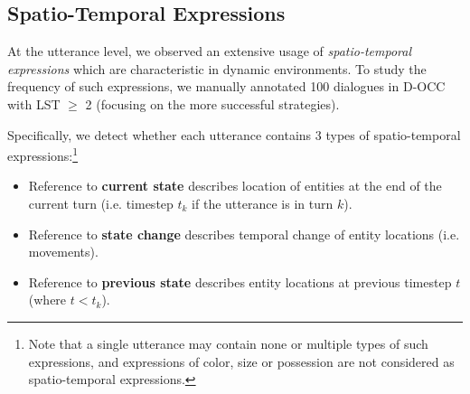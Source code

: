 \begin{table}[th]
\centering {}
\caption{\label{06_tab:nuanced_expressions}
Average occurrences of degree modifiers per 100 utterances (estimated based on keywords).
}
\end{table}


\subsection{Spatio-Temporal Expressions}
\label{06_subsec:spatio_temporal_expressions}

At the utterance level, we observed an extensive usage of \textit{spatio-temporal expressions} which are characteristic in dynamic environments. To study the frequency of such expressions, we manually annotated 100 dialogues in D-OCC with LST $\geq$ 2 (focusing on the more successful strategies).

Specifically, we detect whether each utterance contains 3 types of spatio-temporal expressions:\footnote{Note that a single utterance may contain none or multiple types of such expressions, and expressions of color, size or possession are not considered as spatio-temporal expressions.}

\begin{itemize}
    \item Reference to \textbf{current state} describes location of entities at the end of the current turn (i.e. timestep $t_k$ if the utterance is in turn $k$).
    \item Reference to \textbf{state change} describes temporal change of entity locations (i.e. movements).
    \item Reference to \textbf{previous state} describes entity locations at previous timestep $t$ (where $t < t_k$).
\end{itemize}

